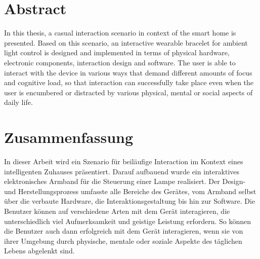 \begingroup
\let\clearpage\relax
\let\cleardoublepage\relax
\let\cleardoublepage\relax

\chapter*{Abstract}
In this thesis, a casual interaction scenario in context of the smart home is presented. Based on this scenario, an interactive wearable bracelet for ambient light control is designed and implemented in terms of physical hardware, electronic components, interaction design and software. The user is able to interact with the device in various ways that demand different amounts of focus and cognitive load, so that interaction can successfully take place even when the user is encumbered or distracted by various physical, mental or social aspects of daily life.

\vfill

\chapter*{Zusammenfassung}
In dieser Arbeit wird ein Szenario f\"ur beil\"aufige Interaction im Kontext eines intelligenten Zuhauses pr\"asentiert. Darauf aufbauend wurde ein interaktives elektronisches Armband f\"ur die Steuerung einer Lam\-pe realisiert. Der Design- und Herstellungsprozess umfasste alle Bereiche des Ger\"ates, vom Armband selbst \"uber die verbaute Hardware, die Interaktionsgestaltung bis hin zur Software. Die Benutzer k\"onnen auf verschiedene Arten mit dem Ger\"at interagieren, die unterschiedlich viel Aufmerksamkeit und geistige Leistung erfordern. So k\"onnen die Benutzer auch dann erfolgreich mit dem Ger\"at interagieren, wenn sie von ihrer Umgebung durch physische, mentale oder soziale Aspekte des t\"aglichen Lebens abgelenkt sind.


\endgroup			

\vfill